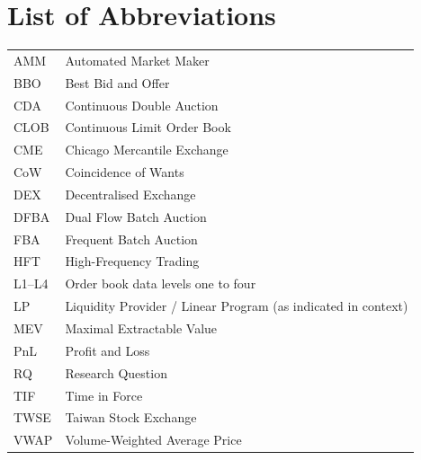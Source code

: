 \cleardoublepage
\chapter*{List of Abbreviations}

\begin{tabular}{ll}
\toprule
AMM   & Automated Market Maker\\
BBO   & Best Bid and Offer\\
CDA   & Continuous Double Auction\\
CLOB  & Continuous Limit Order Book\\
CME   & Chicago Mercantile Exchange\\
CoW   & Coincidence of Wants\\
DEX   & Decentralised Exchange\\
DFBA  & Dual Flow Batch Auction\\
FBA   & Frequent Batch Auction\\
HFT   & High-Frequency Trading\\
L1--L4& Order book data levels one to four\\
LP    & Liquidity Provider / Linear Program (as indicated in context)\\
MEV   & Maximal Extractable Value\\
PnL   & Profit and Loss\\
RQ    & Research Question\\
TIF   & Time in Force\\
TWSE  & Taiwan Stock Exchange\\
VWAP  & Volume-Weighted Average Price\\
\bottomrule
\end{tabular}
